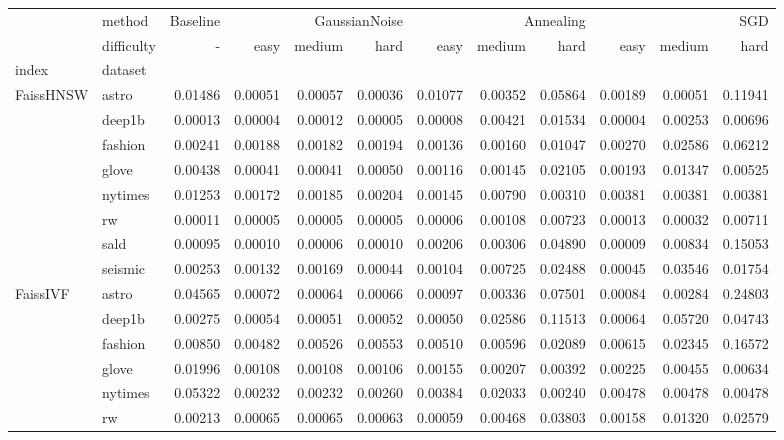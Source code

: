 \begin{tabular}{ll|r|rrr|rrr|rrr}
\toprule
 & method & Baseline & \multicolumn{3}{r}{GaussianNoise} & \multicolumn{3}{r}{Annealing} & \multicolumn{3}{r}{SGD} \\
 & difficulty & - & easy & medium & hard & easy & medium & hard & easy & medium & hard \\
index & dataset &  &  &  &  &  &  &  &  &  &  \\
\midrule
\multirow[t]{8}{*}{FaissHNSW} & astro & 0.01486 & 0.00051 & 0.00057 & 0.00036 & 0.01077 & 0.00352 & 0.05864 & 0.00189 & 0.00051 & 0.11941 \\
 & deep1b & 0.00013 & 0.00004 & 0.00012 & 0.00005 & 0.00008 & 0.00421 & 0.01534 & 0.00004 & 0.00253 & 0.00696 \\
 & fashion & 0.00241 & 0.00188 & 0.00182 & 0.00194 & 0.00136 & 0.00160 & 0.01047 & 0.00270 & 0.02586 & 0.06212 \\
 & glove & 0.00438 & 0.00041 & 0.00041 & 0.00050 & 0.00116 & 0.00145 & 0.02105 & 0.00193 & 0.01347 & 0.00525 \\
 & nytimes & 0.01253 & 0.00172 & 0.00185 & 0.00204 & 0.00145 & 0.00790 & 0.00310 & 0.00381 & 0.00381 & 0.00381 \\
 & rw & 0.00011 & 0.00005 & 0.00005 & 0.00005 & 0.00006 & 0.00108 & 0.00723 & 0.00013 & 0.00032 & 0.00711 \\
 & sald & 0.00095 & 0.00010 & 0.00006 & 0.00010 & 0.00206 & 0.00306 & 0.04890 & 0.00009 & 0.00834 & 0.15053 \\
 & seismic & 0.00253 & 0.00132 & 0.00169 & 0.00044 & 0.00104 & 0.00725 & 0.02488 & 0.00045 & 0.03546 & 0.01754 \\
\cline{1-12}
\multirow[t]{8}{*}{FaissIVF} & astro & 0.04565 & 0.00072 & 0.00064 & 0.00066 & 0.00097 & 0.00336 & 0.07501 & 0.00084 & 0.00284 & 0.24803 \\
 & deep1b & 0.00275 & 0.00054 & 0.00051 & 0.00052 & 0.00050 & 0.02586 & 0.11513 & 0.00064 & 0.05720 & 0.04743 \\
 & fashion & 0.00850 & 0.00482 & 0.00526 & 0.00553 & 0.00510 & 0.00596 & 0.02089 & 0.00615 & 0.02345 & 0.16572 \\
 & glove & 0.01996 & 0.00108 & 0.00108 & 0.00106 & 0.00155 & 0.00207 & 0.00392 & 0.00225 & 0.00455 & 0.00634 \\
 & nytimes & 0.05322 & 0.00232 & 0.00232 & 0.00260 & 0.00384 & 0.02033 & 0.00240 & 0.00478 & 0.00478 & 0.00478 \\
 & rw & 0.00213 & 0.00065 & 0.00065 & 0.00063 & 0.00059 & 0.00468 & 0.03803 & 0.00158 & 0.01320 & 0.02579 \\

\end{tabular}
